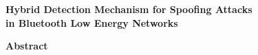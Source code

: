 \pagestyle{plain}{%
\fancyhf{} %
\fancyfoot[C]{\thepage}%
\renewcommand{\headrulewidth}{0pt}
\renewcommand{\footrulewidth}{0pt}}






\newpage
\begin{center} 
\vspace{17pt}
{\sanhao \textbf{Hybrid Detection Mechanism for Spoofing Attacks \\ in Bluetooth Low Energy Networks}}
\vspace{30pt}
\end{center}

\begin{center}
{\xiaosanhao \textbf{Abstract}} 
\vspace{12pt}
\end{center}

